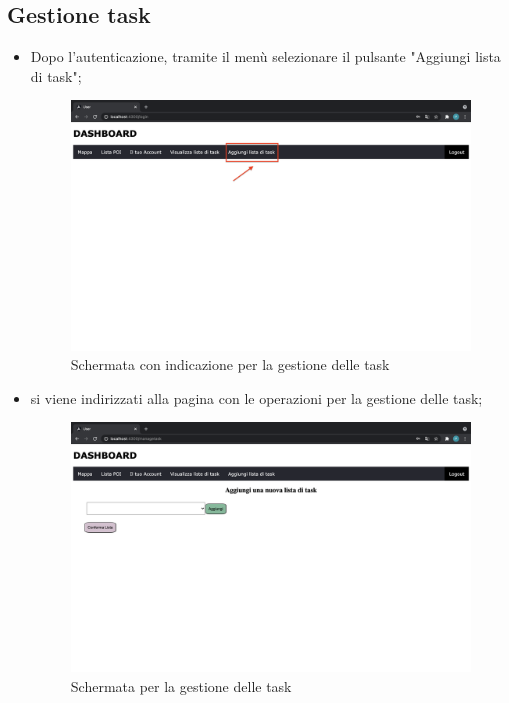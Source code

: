 \subsection{Gestione task}
\begin{itemize}
    \item Dopo l'autenticazione, tramite il menù selezionare il pulsante "Aggiungi lista di task";
        \begin{figure}[H]
        \centering
        \includegraphics[scale=0.2]{res/images/dashboard9.png}
        \caption{Schermata con indicazione per la gestione delle task}
        \end{figure}
    \item si viene indirizzati alla pagina con le operazioni per la gestione delle task; 
    \begin{figure}[H]
        \centering
        \includegraphics[scale=0.12]{res/images/gestiscitask.png}
        \caption{Schermata per la gestione delle task}
    \end{figure}
\end{itemize}





